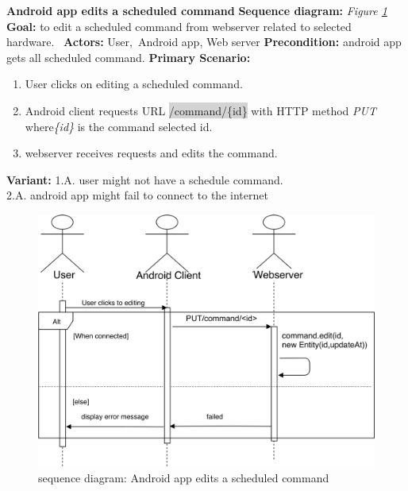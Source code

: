\documentclass[12pt, oneside, a4paper]{book}
\newcommand{\code}[1]{{\color{red}\colorbox{lightgray}{#1}}}
\newcommand\boldcolor[1]{\textcolor{bold}{\textbf{#1}}}
\begin{document}
				\newpage\hspace*{-6mm}\boldcolor{Android app edits a scheduled command}
				\newline\textbf{Sequence diagram:} \textit{Figure \ref{android_edit}}
				\newline\textbf{Goal:} to edit a scheduled command from webserver related to selected hardware. 
				\newline\textbf{Actors:} User, Android app, Web server
				\newline\textbf{Precondition:} android app gets all scheduled command.
				\newline\textbf{Primary Scenario:}	
				\begin{enumerate}[label*=\arabic*.]
					\item User clicks on editing a scheduled command.
					\item Android client requests URL \code{/command/\{id\}} with HTTP method \textit{PUT} where\textit{\{id\}} is the command selected id. 
					\item  webserver receives requests and edits the command.
				\end{enumerate}
				\textbf{Variant:}\newline
				\hspace*{5mm}1.A. user might not have a schedule command. \\
				\hspace*{5mm}2.A. android app might fail to connect to the internet \\
				\begin{figure}[H]
					\includegraphics[width=\linewidth]{img/sequence_android_edit.png}
					\caption{sequence diagram: Android app edits a scheduled command}
					\label{android_edit}
				\end{figure}
\end{document}
